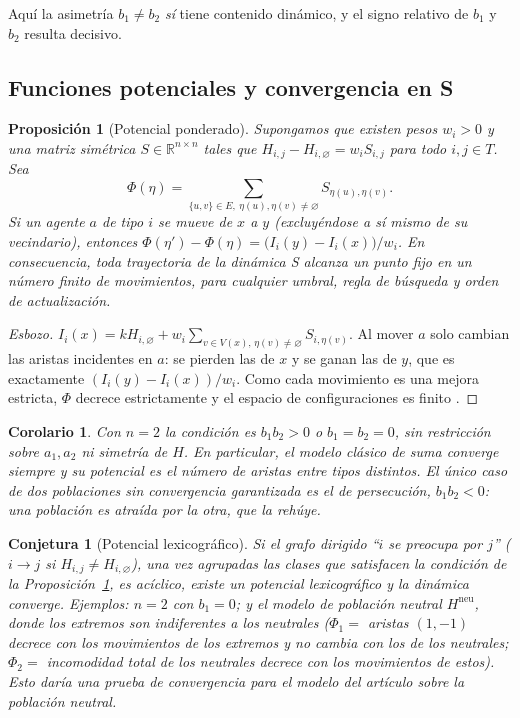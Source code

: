 \documentclass[11pt,a4paper]{article}
\theoremstyle{plain}
\newtheorem{proposicion}{Proposición}
\newtheorem{conjetura}{Conjetura}
\newtheorem{corolario}{Corolario}
\theoremstyle{definition}
\theoremstyle{remark}
\newcommand{\vac}{\varnothing}
\newcommand{\R}{\mathbb{R}}
\newcommand{\modS}{\textsf{S}}
\begin{document}
Aquí la asimetría $b_1\neq b_2$ \emph{sí} tiene contenido dinámico, y el signo
relativo de $b_1$ y $b_2$ resulta decisivo.

\subsection{Funciones potenciales y convergencia en \modS}

\begin{proposicion}[Potencial ponderado]\label{prop:potencial}
Supongamos que existen pesos $w_i>0$ y una matriz simétrica $S\in\R^{n\times n}$
tales que $H_{i,j}-H_{i,\vac}=w_iS_{i,j}$ para todo $i,j\in T$. Sea
\[
 \Phi(\eta)=\sum_{\{u,v\}\in E,\ \eta(u),\eta(v)\neq\vac}S_{\eta(u),\eta(v)} .
\]
Si un agente $a$ de tipo $i$ se mueve de $x$ a $y$ (excluyéndose a sí mismo de
su vecindario), entonces
$\Phi(\eta')-\Phi(\eta)=\bigl(I_i(y)-I_i(x)\bigr)/w_i$. En consecuencia, toda
trayectoria de la dinámica \modS{} alcanza un punto fijo en un número finito de
movimientos, para cualquier umbral, regla de búsqueda y orden de
actualización.
\end{proposicion}

\begin{proof}[Esbozo]
$I_i(x)=kH_{i,\vac}+w_i\sum_{v\in V(x),\,\eta(v)\neq\vac}S_{i,\eta(v)}$.
Al mover $a$ solo cambian las aristas incidentes en $a$: se pierden las de $x$ y
se ganan las de $y$, que es exactamente $(I_i(y)-I_i(x))/w_i$. Como cada
movimiento es una mejora estricta, $\Phi$ decrece estrictamente y el espacio de
configuraciones es finito \cite{MondererShapley1996}.
\end{proof}

\begin{corolario}
Con $n=2$ la condición es $b_1b_2>0$ o $b_1=b_2=0$, sin restricción sobre
$a_1,a_2$ ni simetría de $H$. En particular, el modelo clásico de suma converge
siempre y su potencial es el número de aristas entre tipos distintos. El único
caso de dos poblaciones sin convergencia garantizada es el de
\emph{persecución}, $b_1b_2<0$: una población es atraída por la otra, que la
rehúye.
\end{corolario}

\begin{conjetura}[Potencial lexicográfico]\label{conj:lex}
Si el grafo dirigido ``$i$ se preocupa por $j$'' ($i\to j$ si
$H_{i,j}\neq H_{i,\vac}$), una vez agrupadas las clases que satisfacen la
condición de la Proposición~\ref{prop:potencial}, es acíclico, existe un
potencial lexicográfico y la dinámica converge. Ejemplos: $n=2$ con $b_1=0$; y
el modelo de población neutral $H^{\mathrm{neu}}$, donde los extremos son
indiferentes a los neutrales ($\Phi_1=$ aristas $(1,-1)$ decrece con los
movimientos de los extremos y no cambia con los de los neutrales;
$\Phi_2=$ incomodidad total de los neutrales decrece con los movimientos de
estos). Esto daría una prueba de convergencia para el modelo del artículo sobre
la población neutral.
\end{conjetura}
\end{document}
